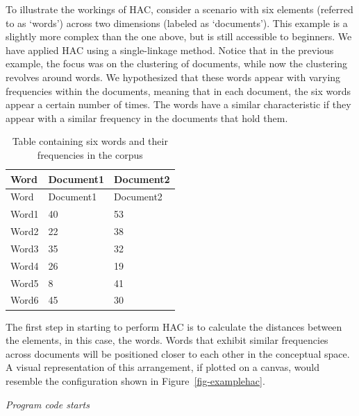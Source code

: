 To illustrate the workings of HAC, consider a scenario with six elements
(referred to as `words') across two dimensions (labeled as
`documents'). This example is a slightly more complex than the
one above, but is still accessible to beginners. We have applied HAC using a single-linkage method. Notice that in the
previous example, the focus was on the clustering of documents, while now
the clustering revolves around words. We hypothesized that these words appear
with varying frequencies within the documents, meaning that in each
document, the six words appear a certain number of times. The words have
a similar characteristic if they appear with a similar frequency in the
documents that hold them.

\begin{longtable}[]{@{}lll@{}}
\caption{Table containing six words and their frequencies in the
corpus}\label{tbl-tablehac}\tabularnewline
\toprule\noalign{}
Word & Document1 & Document2 \\
\midrule\noalign{}
\endfirsthead
\toprule\noalign{}
Word & Document1 & Document2 \\
\midrule\noalign{}
\endhead
\bottomrule\noalign{}
\endlastfoot
Word1 & 40 & 53 \\
Word2 & 22 & 38 \\
Word3 & 35 & 32 \\
Word4 & 26 & 19 \\
Word5 & 8 & 41 \\
Word6 & 45 & 30 \\
\end{longtable}

The first step in starting to perform HAC is to calculate the distances
between the elements, in this case, the words. Words that exhibit similar
frequencies across documents will be positioned closer to each other in
the conceptual space. A visual representation of this arrangement, if
plotted on a canvas, would resemble the configuration shown in
Figure~\ref{fig-examplehac}.

\emph{Program code starts}

